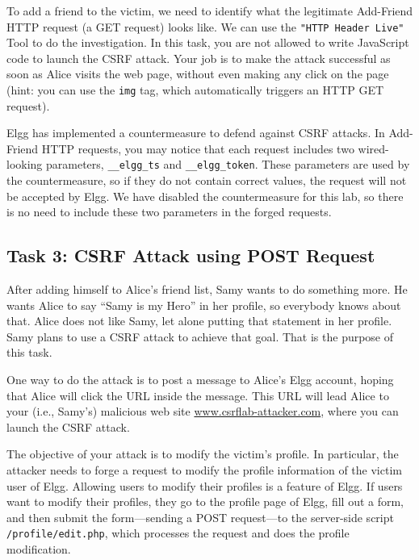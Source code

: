 To add a friend to the victim, we need to identify what the legitimate 
Add-Friend HTTP request (a GET request) looks like. We can use 
the \texttt{"HTTP Header Live"} Tool to do the investigation. 
In this task, you are not allowed to
write JavaScript code to launch the CSRF attack. Your job is to make the
attack successful as soon as Alice visits the web page, without even making
any click on the page (hint: you can use the {\tt img} tag, which
automatically triggers an HTTP GET request).
 

Elgg has implemented a countermeasure to defend against 
CSRF attacks. In Add-Friend HTTP requests, you may notice that each 
request includes two wired-looking parameters, \texttt{\_\_elgg\_ts} and 
\texttt{\_\_elgg\_token}. These parameters are used by the countermeasure, so if they do not
contain correct values, the request will not be accepted by Elgg.   
We have disabled the countermeasure for this lab, so there is no need to include these two 
parameters in the forged requests. 


\subsection{Task 3: CSRF Attack using POST Request}

After adding himself to Alice's friend list, Samy wants to do something more. He 
wants Alice to say ``Samy is my Hero'' in her profile, so everybody knows 
about that. Alice does not like Samy, let alone putting that statement 
in her profile. Samy plans to use a CSRF attack to achieve that goal. 
That is the purpose of this task. 


One way to do the attack is to post a message to Alice's Elgg account, hoping that 
Alice will click the URL inside the message. This URL will lead Alice to your (i.e., Samy's)
malicious web site \url{www.csrflab-attacker.com}, where you can launch the
CSRF attack. 

The objective of your attack is to modify the victim's profile. 
In particular, the attacker needs to forge a request 
to modify the profile information of the victim user of Elgg. 
Allowing users to modify their profiles is a feature of 
Elgg. If  users want to modify their profiles,
they go to the profile page of Elgg, fill out 
a form, and then submit the form---sending a POST request---to 
the server-side script {\tt /profile/edit.php}, which 
processes the request and does the profile modification.


